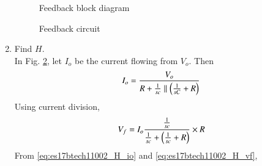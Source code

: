 \begin{enumerate}[label=\arabic*.,ref=\theenumi]
\begin{figure}[!ht]
	\begin{center}
		\resizebox{\columnwidth}{!}{}
	\end{center}
\caption{Feedback block diagram}
\label{fig:es17btech11002_fig4}
\end{figure}
\begin{figure}[!ht]
	\begin{center}
		\resizebox{\columnwidth}{!}{}
	\end{center}
\caption{Feedback circuit}
\label{fig:es17btech11002_fig5}
\end{figure}
\renewcommand{\thefigure}{\theenumi}
\item Find $H$.
\\
\solution In Fig. \ref{fig:es17btech11002_fig5}, let $I_o$ be the current flowing from $V_o$.  Then
\begin{align}
\label{eq:es17btech11002_H_io}
I_o = \frac{V_o}{R + \frac{1}{sc} \parallel \left(\frac{1}{sC}+R\right)}
\end{align}
%
Using current division,
\begin{align}
\label{eq:es17btech11002_H_vf}
V_f = I_o \frac{\frac{1}{sc}}{\frac{1}{sc} +  \left(\frac{1}{sc}+R\right)} \times R
\end{align}
From \eqref{eq:es17btech11002_H_io} and \eqref{eq:es17btech11002_H_vf},


\end{enumerate}
